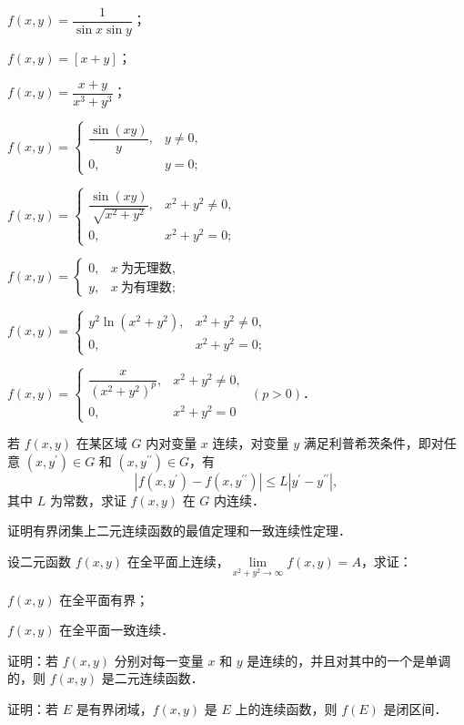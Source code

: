 \begin{xiti}
\begin{ziti}
\item $f(x,y)=\dfrac{1}{\sin x\sin y}$；
\item $f(x,y)=[x+y]$；
\item $f(x,y)=\dfrac{x+y}{x^{3}+y^{3}}$；
\item $f(x,y)=\begin{cases}\dfrac{\sin(xy)}{y}, & y\neq0,\\[4pt] 0, & y=0;\end{cases}$
\item $f(x,y)=\begin{cases}\dfrac{\sin(xy)}{\sqrt{x^{2}+y^{2}}}, & x^{2}+y^{2}\neq0,\\[4pt] 0, & x^{2}+y^{2}=0;\end{cases}$
\item $f(x,y)=\begin{cases}0, & x\ \text{为无理数},\\ y, & x\ \text{为有理数};\end{cases}$
\item $f(x,y)=\begin{cases}y^{2}\ln\left(x^{2}+y^{2}\right), & x^{2}+y^{2}\neq0,\\ 0, & x^{2}+y^{2}=0;\end{cases}$
\item $f(x,y)=\begin{cases}\dfrac{x}{\left(x^{2}+y^{2}\right)^{p}}, & x^{2}+y^{2}\neq0,\\[4pt] 0, & x^{2}+y^{2}=0\end{cases}$ $(p>0)$．
\end{ziti}
\item 若 $f(x,y)$ 在某区域 $G$ 内对变量 $x$ 连续，对变量 $y$ 满足利普希茨条件，即对任意 $(x,y^{\prime})\in G$ 和 $(x,y^{\prime\prime})\in G$，有
\[
\left|f\left(x,y^{\prime}\right)-f\left(x,y^{\prime\prime}\right)\right|\leqslant L\left|y^{\prime}-y^{\prime\prime}\right|,
\]
其中 $L$ 为常数，求证 $f(x,y)$ 在 $G$ 内连续．
\item 证明有界闭集上二元连续函数的最值定理和一致连续性定理．
\item 设二元函数 $f(x,y)$ 在全平面上连续，$\lim\limits_{x^{2}+y^{2}\to\infty}f(x,y)=A$，求证：
\begin{ziti}
\item $f(x,y)$ 在全平面有界；
\item $f(x,y)$ 在全平面一致连续．
\end{ziti}
\item 证明：若 $f(x,y)$ 分别对每一变量 $x$ 和 $y$ 是连续的，并且对其中的一个是单调的，则 $f(x,y)$ 是二元连续函数．
\item 证明：若 $E$ 是有界闭域，$f(x,y)$ 是 $E$ 上的连续函数，则 $f(E)$ 是闭区间．
\end{xiti}

